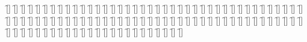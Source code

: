 \begin{questions}
\begin{multicols}{2}
        \question  \f[]
        \question  \f[]
        \question  \f[]
        \question  \f[]
        \question  \f[]
        \question  \f[]
        \question  \f[]
        \question  \f[]
        \question  \f[]
        \question  \f[]
        \question  \f[]
        \question  \f[]
        \question  \f[]
        \question  \f[]
        \question  \f[]
        \question  \f[]
        \question  \f[]
        \question  \f[]
        \question  \f[]
        \question  \f[]
        \question  \f[]
        \question  \f[]
        \question  \f[]
        \question  \f[]
        \question  \f[]
        \question  \f[]
        \question  \f[]
        \question  \f[]
        \question  \f[]
        \question  \f[]
        \question  \f[]
        \question  \f[]
        \question  \f[]
        \question  \f[]
        \question  \f[]
        \question  \f[]
        \question  \f[]
        \question  \f[]
        \question  \f[]
        \question  \f[]
        \question  \f[]
        \question  \f[]
        \question  \f[]
        \question  \f[]
        \question  \f[]
        \question  \f[]
        \question  \f[]
        \question  \f[]
        \question  \f[]
        \question  \f[]
        \question  \f[]
        \question  \f[]
        \question  \f[]
        \question  \f[]
        \question  \f[]
        \question  \f[]
        \question  \f[]
        \question  \f[]
        \question  \f[]
        \question  \f[]
        \question  \f[]
        \question  \f[]
        \question  \f[]
        \question  \f[]
        \question  \f[]
        \question  \f[]
        \question  \f[]
        \question  \f[]
        \question  \f[]
        \question  \f[]
        \question  \f[]
        \question  \f[]
        \question  \f[]
        \question  \f[]
        \question  \f[]
        \question  \f[]
        \question  \f[]
        \question  \f[]
        \question  \f[]
        \question  \f[]
        \question  \f[]
        \question  \f[]
        \question  \f[]
        \question  \f[]
        \question  \f[]
        \question  \f[]
        \question  \f[]
        \question  \f[]
        \question  \f[]
        \question  \f[]
        \question  \f[]
        \question  \f[]
        \question  \f[]
        \question  \f[]
        \question  \f[]
        \question  \f[]
        \question  \f[]
        \question  \f[]
        \question  \f[]
        \question  \f[]
        \question  \f[]
        \question  \f[]
        \question  \f[]
        \question  \f[]
    \end{multicols}
\end{questions}
